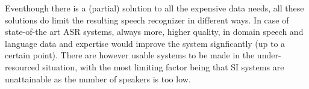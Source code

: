 \documentclass[b5paper]{article}
\newcommand{\todo}[2]{{\textcolor{red}{\bf [#1] #2 }}}
\newcommand{\ns}{{Northern Sámi }}
\begin{document}
Eventhough there is a (partial) solution to all the expensive data needs, all these solutions do limit the resulting speech recognizer in different ways. In case of state-of-the art ASR systems, always more, higher quality, in domain speech and language data and expertise would improve the system signficantly (up to a certain point). There are however usable systems to be made in the under-resourced situation, with the most limiting factor being that SI systems are unattainable as the number of speakers is too low.




%	
%	
%	
%	
\end{document}
